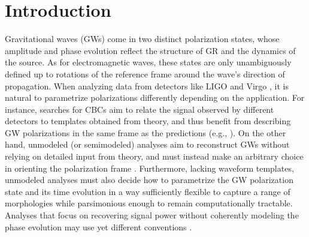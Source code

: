 \documentclass[aps,prd,twocolumn,superscriptaddress,preprintnumbers,floatfix,nofootinbib]{revtex4-2}
\begin{document}
\maketitle


\begin{acronym}
\end{acronym}

\section{Introduction}
\label{sec:intro}

Gravitational waves (GWs) come in two distinct polarization states, whose amplitude and phase evolution reflect the structure of \ac{GR} and the dynamics of the source.
As for electromagnetic waves, these states are only unambiguously defined up to rotations of the reference frame around the wave's direction of propagation.
When analyzing data from detectors like LIGO \cite{TheLIGOScientific:2014jea} and Virgo \cite{TheVirgo:2014hva}, it is natural to parametrize polarizations differently depending on the application.
For instance, searches for \acp{CBC} aim to relate the signal observed by different detectors to templates obtained from theory, and thus benefit from describing GW polarizations in the same frame as the predictions (e.g., \cite{Faye:2012we,Kidder:2007rt}).
On the other hand, unmodeled (or semimodeled) analyses aim to reconstruct GWs without relying on detailed input from theory, and must instead make an arbitrary choice in orienting the polarization frame \cite{Klimenko:2004qh,Klimenko:2005xv,Klimenko:2008fu,Cornish:2014kda,Cornish:2020dwh}.
Furthermore, lacking waveform templates, unmodeled analyses must also decide how to parametrize the GW polarization state and its time evolution in a way sufficiently flexible to capture a range of morphologies while parsimonious enough to remain computationally tractable.
Analyses that focus on recovering signal power without coherently modeling the phase evolution may use yet different conventions \cite{Romano:2016dpx}.
\end{document}
